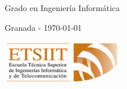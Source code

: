 \begin{titlepage}
\begin{center}
		\large{Grado en Ingeniería Informática}\\
		\vspace*{0.06in}


		Granada - \today
		
		\vspace*{1.0cm}



		\includegraphics[width=0.4\textwidth]{assets/images/portada/etsiit_logo.png}
	\end{center}
\end{titlepage}